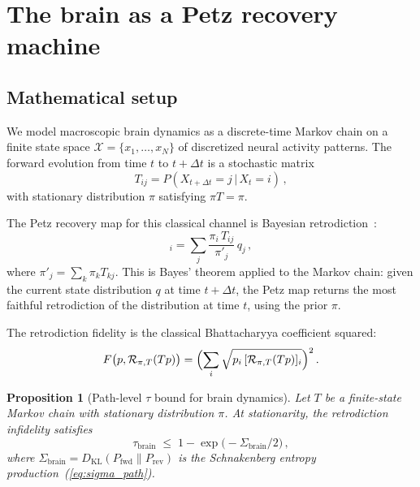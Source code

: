 \documentclass[prl,twocolumn,superscriptaddress,longbibliography,floatfix]{revtex4-2}
\newtheorem{proposition}[theorem]{Proposition}
\newcommand{\Petz}{\mathcal{R}}
\newcommand{\tauasym}{\tau}
\newcommand{\Sbrain}{\Sigma_{\mathrm{brain}}}
\newcommand{\DKL}{D_{\mathrm{KL}}}
\begin{document}
\section{The brain as a Petz recovery machine}
\label{sec:brain_petz}

\subsection{Mathematical setup}
\label{subsec:math_setup}

We model macroscopic brain dynamics as a discrete-time Markov chain
on a finite state space $\mathcal{X} = \{x_1,\ldots,x_N\}$ of
discretized neural activity patterns.  The forward evolution from
time $t$ to $t+\Delta t$ is a stochastic matrix
\begin{equation}
T_{ij} = P(X_{t+\Delta t}=j\,|\,X_t = i)\,,
\end{equation}
with stationary distribution $\pi$ satisfying $\pi T = \pi$.

The Petz recovery map for this classical channel is Bayesian
retrodiction~\cite{Parzygnat2023}:
\begin{equation}
[\Petz_{\pi,T}(q)]_i = \sum_j
\frac{\pi_i\,T_{ij}}{\pi'_j}\,q_j\,,
\label{eq:classical_petz}
\end{equation}
where $\pi'_j = \sum_k\pi_k T_{kj}$.  This is Bayes' theorem
applied to the Markov chain: given the current state distribution
$q$ at time $t+\Delta t$, the Petz map returns the most
faithful retrodiction of the distribution at time $t$, using the
prior $\pi$.

The retrodiction fidelity is the classical Bhattacharyya coefficient
squared:
\begin{equation}
F\bigl(p,\Petz_{\pi,T}(Tp)\bigr)
= \Bigl(\sum_i\sqrt{p_i\,[\Petz_{\pi,T}(Tp)]_i}\Bigr)^2\,.
\end{equation}

\begin{proposition}[Path-level $\tauasym$ bound for brain dynamics]
\label{prop:brain_bound}
Let $T$ be a finite-state Markov chain with stationary distribution
$\pi$.  At stationarity, the retrodiction infidelity satisfies
\begin{equation}
\tauasym_{\mathrm{brain}}
\;\leq\; 1 - \exp\!\bigl(-\Sbrain/2\bigr)\,,
\label{eq:brain_bound}
\end{equation}
where $\Sbrain = \DKL(P_{\mathrm{fwd}}\|P_{\mathrm{rev}})$ is
the Schnakenberg entropy production~(\ref{eq:sigma_path}).
\end{proposition}
\end{document}
